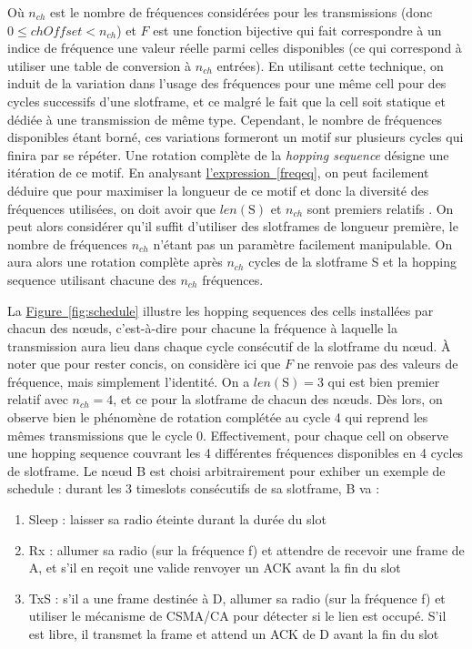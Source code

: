 \documentclass[]{report}
\newcommand{\wordlink}[2]{\hyperref[#2]{#1~\ref{#2}}}
\begin{document}
\par Où $n_{ch}$ est le nombre de fréquences considérées pour les transmissions (donc $0 \leq chOffset < n_{ch}$) et $F$ est une fonction bijective qui fait correspondre à un indice de fréquence une valeur réelle parmi celles disponibles (ce qui correspond à utiliser une table de conversion à $n_{ch}$ entrées). En utilisant cette technique, on induit de la variation dans l'usage des fréquences pour une même cell pour des cycles successifs d'une slotframe, et ce malgré le fait que la cell soit statique et dédiée à une transmission de même type. Cependant, le nombre de fréquences disponibles étant borné, ces variations formeront un motif sur plusieurs cycles qui finira par se répéter. Une rotation complète de la \textit{hopping sequence} désigne une itération de ce motif. En analysant \wordlink{l'expression}{freqeq}, on peut facilement déduire que pour maximiser la longueur de ce motif et donc la diversité des fréquences utilisées, on doit avoir que $len(\text{S})$ et $n_{ch}$ sont premiers relatifs \cite{stack-IoT} \cite{rfc7554}. On peut alors considérer qu'il suffit d'utiliser des slotframes de longueur première, le nombre de fréquences $n_{ch}$ n'étant pas un paramètre facilement manipulable. On aura alors une rotation complète après $n_{ch}$ cycles de la slotframe S et la hopping sequence utilisant chacune des $n_{ch}$ fréquences.\\

\par La \wordlink{Figure}{fig:schedule} illustre les hopping sequences des cells installées par chacun des nœuds, c'est-à-dire pour chacune la fréquence à laquelle la transmission aura lieu dans chaque cycle consécutif de la slotframe du nœud. À noter que pour rester concis, on considère ici que $F$ ne renvoie pas des valeurs de fréquence, mais simplement l'identité. On a $len(\text{S}) = 3$ qui est bien premier relatif avec $n_{ch} = 4$, et ce pour la slotframe de chacun des nœuds. Dès lors, on observe bien le phénomène de rotation complétée au cycle 4 qui reprend les mêmes transmissions que le cycle 0. Effectivement, pour chaque cell on observe une hopping sequence couvrant les 4 différentes fréquences disponibles en 4 cycles de slotframe. Le nœud B est choisi arbitrairement pour exhiber un exemple de schedule : durant les 3 timeslots consécutifs de sa slotframe, B va :

\begin{enumerate}
\item Sleep : laisser sa radio éteinte durant la durée du slot
\item Rx : allumer sa radio (sur la fréquence f) et attendre de recevoir une frame de A, et s'il en reçoit une valide renvoyer un ACK avant la fin du slot
\item TxS : s'il a une frame destinée à D, allumer sa radio (sur la fréquence f) et utiliser le mécanisme de CSMA/CA pour détecter si le lien est occupé. S'il est libre, il transmet la frame et attend un ACK de D avant la fin du slot
\end{enumerate}
\end{document}
